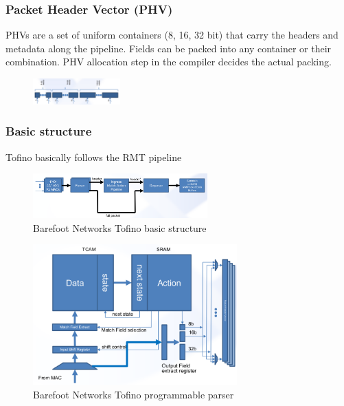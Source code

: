 \documentclass[11pt,oneside,a4paper]{article}
\begin{document}
\subsubsection{Packet Header Vector (PHV)}

PHVs are a set of uniform containers (8, 16, 32 bit) that carry the headers and metadata along the pipeline. Fields can be packed into any container or their combination. PHV allocation step in the compiler decides the actual packing.

\begin{figure}[hb]
	\centering
	\includegraphics[width=0.3\textwidth,scale=1]{figures/phv}
	\label{fig:phv}
\end{figure}

\subsubsection{Basic structure}

Tofino basically follows the RMT pipeline

\begin{figure}[hb]
	\centering
	\includegraphics[width=0.6\textwidth,scale=1]{figures/tofino_rmt}
	\caption{Barefoot Networks Tofino basic structure \cite{barefoot}}
	\label{fig:tofino_rmt}
\end{figure}

\begin{figure}[hb]
	\centering
	\includegraphics[width=0.7\textwidth,scale=1]{figures/tofino_parser}
	\caption{Barefoot Networks Tofino programmable parser \cite{barefoot}}
	\label{fig:tofino_parser}
\end{figure}
\end{document}
